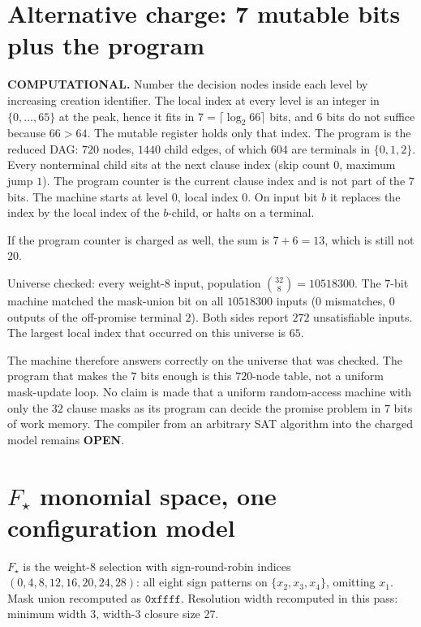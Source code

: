 \documentclass[11pt]{article}
\begin{document}
\section*{Alternative charge: 7 mutable bits plus the program}
\textbf{COMPUTATIONAL.}
Number the decision nodes inside each level by increasing creation identifier.
The local index at every level is an integer in \(\{0,\ldots,65\}\) at the peak, hence it fits in \(7=\lceil\log_2 66\rceil\) bits, and \(6\) bits do not suffice because \(66>64\).
The mutable register holds only that index.
The program is the reduced DAG: \(720\) nodes, \(1440\) child edges, of which \(604\) are terminals in \(\{0,1,2\}\).
Every nonterminal child sits at the next clause index (skip count \(0\), maximum jump \(1\)).
The program counter is the current clause index and is not part of the \(7\) bits.
The machine starts at level \(0\), local index \(0\).
On input bit \(b\) it replaces the index by the local index of the \(b\)-child, or halts on a terminal.

If the program counter is charged as well, the sum is \(7+6=13\), which is still not \(20\).

Universe checked: every weight-\(8\) input, population \(\binom{32}{8}=10518300\).
The \(7\)-bit machine matched the mask-union bit on all \(10518300\) inputs
(\(0\) mismatches, \(0\) outputs of the off-promise terminal \(2\)).
Both sides report \(272\) unsatisfiable inputs.
The largest local index that occurred on this universe is \(65\).

The machine therefore answers correctly on the universe that was checked.
The program that makes the \(7\) bits enough is this \(720\)-node table, not a uniform mask-update loop.
No claim is made that a uniform random-access machine with only the \(32\) clause masks as its program can decide the promise problem in \(7\) bits of work memory.
The compiler from an arbitrary SAT algorithm into the charged model remains \textbf{OPEN}.

\section*{\(F_\star\) monomial space, one configuration model}
\(F_\star\) is the weight-\(8\) selection with sign-round-robin indices
\((0,4,8,12,16,20,24,28)\):
all eight sign patterns on \(\{x_2,x_3,x_4\}\), omitting \(x_1\).
Mask union recomputed as \(\mathtt{0xffff}\).
Resolution width recomputed in this pass: minimum width \(3\), width-\(3\) closure size \(27\).
\end{document}
